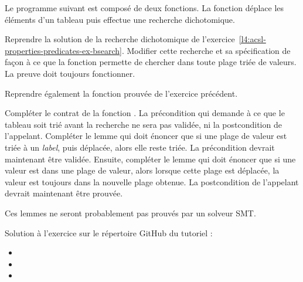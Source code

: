 

Le programme suivant est composé de deux fonctions. La fonction
 déplace les éléments d'un tableau puis effectue
une recherche dichotomique.




Reprendre la solution de la recherche dichotomique de
l'exercice~\ref{l4:acsl-properties-predicates-ex-bsearch}. Modifier cette
recherche et sa spécification de façon à ce que la fonction permette de
chercher dans toute plage triée de valeurs. La preuve doit toujours fonctionner.


Reprendre également la fonction prouvée  de l'exercice
précédent.


Compléter le contrat de la fonction . La
précondition qui demande à ce que le tableau soit trié avant la recherche ne
sera pas validée, ni la postcondition de l'appelant. Compléter le lemme
 qui doit énoncer que si une plage de valeur
est triée à un \textit{label}, puis déplacée, alors elle reste triée. La
précondition devrait maintenant être validée. Ensuite, compléter le lemme
 qui doit énoncer que si une valeur est dans
une plage de valeur, alors lorsque cette plage est déplacée, la valeur est
toujours dans la nouvelle plage obtenue. La postcondition de l'appelant devrait
maintenant être prouvée.


Ces lemmes ne seront probablement pas prouvés par un solveur SMT.

\begin{Information}
  Solution à l'exercice sur le répertoire GitHub du tutoriel :
  \begin{itemize}
    \item {}
    \item {}
    \item {}
  \end{itemize}
\end{Information}
